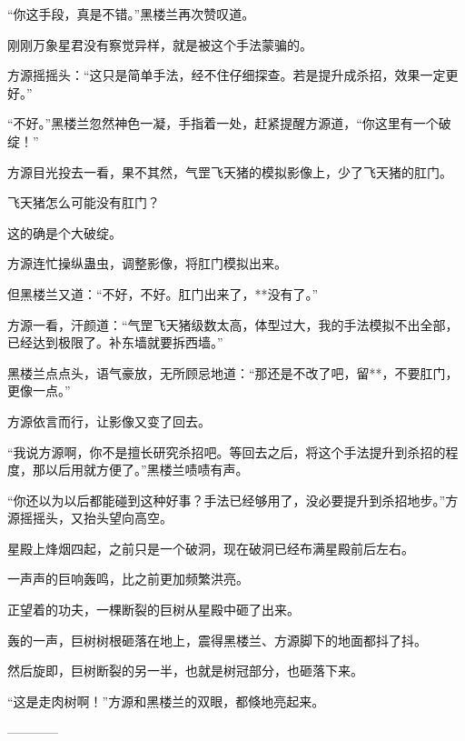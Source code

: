\begin{this_body}
“你这手段，真是不错。”黑楼兰再次赞叹道。

刚刚万象星君没有察觉异样，就是被这个手法蒙骗的。

方源摇摇头：“这只是简单手法，经不住仔细探查。若是提升成杀招，效果一定更好。”

“不好。”黑楼兰忽然神色一凝，手指着一处，赶紧提醒方源道，“你这里有一个破绽！”

方源目光投去一看，果不其然，气罡飞天猪的模拟影像上，少了飞天猪的肛门。

飞天猪怎么可能没有肛门？

这的确是个大破绽。

方源连忙操纵蛊虫，调整影像，将肛门模拟出来。

但黑楼兰又道：“不好，不好。肛门出来了，**没有了。”

方源一看，汗颜道：“气罡飞天猪级数太高，体型过大，我的手法模拟不出全部，已经达到极限了。补东墙就要拆西墙。”

黑楼兰点点头，语气豪放，无所顾忌地道：“那还是不改了吧，留**，不要肛门，更像一点。”

方源依言而行，让影像又变了回去。

“我说方源啊，你不是擅长研究杀招吧。等回去之后，将这个手法提升到杀招的程度，那以后用就方便了。”黑楼兰啧啧有声。

“你还以为以后都能碰到这种好事？手法已经够用了，没必要提升到杀招地步。”方源摇摇头，又抬头望向高空。

星殿上烽烟四起，之前只是一个破洞，现在破洞已经布满星殿前后左右。

一声声的巨响轰鸣，比之前更加频繁洪亮。

正望着的功夫，一棵断裂的巨树从星殿中砸了出来。

轰的一声，巨树树根砸落在地上，震得黑楼兰、方源脚下的地面都抖了抖。

然后旋即，巨树断裂的另一半，也就是树冠部分，也砸落下来。

“这是走肉树啊！”方源和黑楼兰的双眼，都倏地亮起来。

------------

\end{this_body}

